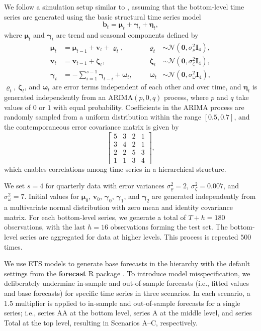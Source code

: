 \documentclass[
  11pt]{article}
\theoremstyle{plain}
\theoremstyle{remark}
\begin{document}
We follow a simulation setup similar to \citet{Wickramasuriya2019-fc},
assuming that the bottom-level time series are generated using the basic
structural time series model \[
\bm{b}_t=\bm{\mu}_t+\bm{\gamma}_t+\bm{\eta}_t,
\] where \(\bm{\mu}_t\) and \(\bm{\gamma}_t\) are trend and seasonal
components defined by \begin{align*}
\bm{\mu}_t & =\bm{\mu}_{t-1}+\bm{v}_t+\bm{\varrho}_t, &&& \bm{\varrho}_t & \sim \mathcal{N}\left(\bm{0}, \sigma_{\varrho}^2 \bm{I}_4\right), \\
\bm{v}_t & =\bm{v}_{t-1}+\bm{\zeta}_t, &&& \bm{\zeta}_t & \sim \mathcal{N}\left(\bm{0}, \sigma_\zeta^2 \bm{I}_4\right), \\
\bm{\gamma}_t & =-\sum_{i=1}^{s-1} \bm{\gamma}_{t-i}+\bm{\omega}_t, &&& \bm{\omega}_t & \sim \mathcal{N}\left(\bm{0}, \sigma_\omega^2 \bm{I}_4\right),
\end{align*} \(\bm{\varrho}_t\), \(\bm{\zeta}_t\), and \(\bm{\omega}_t\)
are error terms independent of each other and over time, and
\(\bm{\eta}_t\) is generated independently from an
\(\text{ARIMA}(p,0,q)\) process, where \(p\) and \(q\) take values of
\(0\) or \(1\) with equal probability. Coefficients in the ARIMA process
are randomly sampled from a uniform distribution within the range
\([0.5, 0.7]\), and the contemporaneous error covariance matrix is given
by \[
\left[\begin{array}{llll}
5 & 3 & 2 & 1 \\
3 & 4 & 2 & 1 \\
2 & 2 & 5 & 3 \\
1 & 1 & 3 & 4
\end{array}\right],
\] which enables correlations among time series in a hierarchical
structure.

We set \(s = 4\) for quarterly data with error variances
\(\sigma_{\varrho}^2=2\), \(\sigma_\zeta^2=0.007\), and
\(\sigma_\omega^2=7\). Initial values for \(\bm{\mu}_0\), \(\bm{v}_0\),
\(\bm{\gamma}_0\), \(\bm{\gamma}_1\), and \(\bm{\gamma}_2\) are
generated independently from a multivariate normal distribution with
zero mean and identity covariance matrix. For each bottom-level series,
we generate a total of \(T+h = 180\) observations, with the last
\(h = 16\) observations forming the test set. The bottom-level series
are aggregated for data at higher levels. This process is repeated
\(500\) times.

We use ETS models to generate base forecasts in the hierarchy with the
default settings from the \textbf{forecast} R package
\citep{Hyndman2023-fc}. To introduce model misspecification, we
deliberately undermine in-sample and out-of-sample forecasts (i.e.,
fitted values and base forecasts) for specific time series in three
scenarios. In each scenario, a 1.5 multiplier is applied to in-sample
and out-of-sample forecasts for a single series; i.e., series AA at the
bottom level, series A at the middle level, and series Total at the top
level, resulting in Scenarios A--C, respectively.
\end{document}
